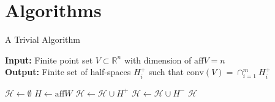 \documentclass[9pt]{beamer}
\newcommand\R{\mathbb{R}}
\theoremstyle{definition}
\begin{document}


\section{Algorithms}

\begin{frame}[fragile]{A Trivial Algorithm}
  
  \begin{algorithm}[H]
    \textbf{Input:} Finite point set $V \subset \R^n$ with dimension of $\text{aff}V = n$\\
    \textbf{Output:} Finite set of half-spaces $H_i^+$ such that $\text{conv}(V) =
    \cap_{i=1}^m H_i^+$
    \begin{algorithmic}[1]
      \STATE $\mathcal{H} \leftarrow \emptyset$
      \STATE $H \leftarrow \text{aff} W$
      \STATE $\mathcal{H} \leftarrow \mathcal{H} \cup H^+$
      \ELSE
      \STATE$\mathcal{H} \leftarrow \mathcal{H} \cup H^-$
      \ENDIF
      \ENDIF
      \ENDFOR
      \RETURN $\mathcal{H}$
    \end{algorithmic}
  \end{algorithm}
\end{frame}
\end{document}
